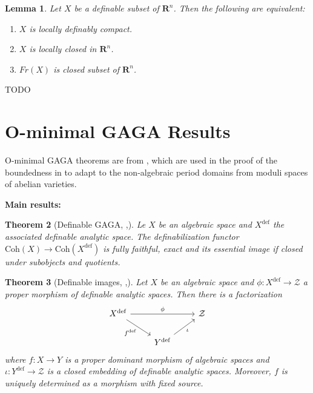 \documentclass{amsart}
\newtheorem{theorem}{Theorem}[subsection]
\newtheorem{lemma}[theorem]{Lemma}
\theoremstyle{definition}
\numberwithin{equation}{section}
\newcommand{\definable}{\mathrm{def}}
\begin{document}
\begin{lemma}
    Let $X$ be a definable subset of $\mathbf{R}^n$.
    Then the following are equivalent:
    \begin{enumerate}[label = {(\roman*)}]
        \item $X$ is locally definably compact.
        \item $X$ is locally closed in $\mathbf{R}^n$.
        \item $Fr(X)$ is closed subset of $\mathbf{R}^n$.
    \end{enumerate}
\end{lemma}

TODO

\section{O-minimal GAGA Results}
O-minimal GAGA theorems are from \cite{zbMATH07662555},
which are used in the proof of the boundedness in \cite{arXiv:2507.00973,arXiv:2508.19215}
to adapt to the non-algebraic period domains from moduli spaces of abelian varieties.

\vspace{1em}

{\noindent\Large\bfseries Main results:}

\begin{theorem}[{Definable GAGA, \cite[Theorem 2.1]{arXiv:2508.19215},\cite[Theorem 1.4]{zbMATH07662555}}]
    Le $X$ be an algebraic space and $X^{\definable}$ the associated definable analytic space.
    The definabilization functor $\mathrm{Coh}(X) \to \mathrm{Coh}(X^{\definable})$ is fully faithful, exact and 
    its essential image if closed under subobjects and quotients.
\end{theorem}

\begin{theorem}[{Definable images, \cite[Theorem 2.2]{arXiv:2508.19215},\cite[Theorem 1.3]{zbMATH07662555}}]
    \label{def image}
    Let $X$ be an algebraic space and 
    $\phi: X^{\definable} \to \mathcal{Z}$ a proper morphism of definable analytic spaces.
    Then there is a factorization
    \[\begin{tikzcd}
    X^{\definable}\ar[rr,"\phi"]\ar[dr,"f^{\definable}"'] & & \mathcal{Z} \\
    & Y^{\definable}\ar[ur,"\iota"'] &
    \end{tikzcd}\]
    where $f: X\to Y$ is a proper dominant morphism of algebraic spaces and 
    $\iota: Y^{\definable} \to \mathcal{Z}$ is a closed embedding of definable analytic spaces.
    Moreover, $f$ is uniquely determined as a morphism with fixed source.
\end{theorem}
\end{document}
